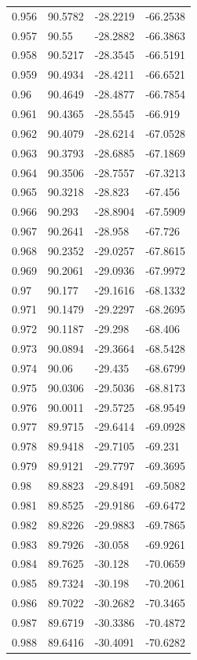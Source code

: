 \begin{tabular}{llll}
0.956 & 90.5782 & -28.2219 & -66.2538 \\
0.957 & 90.55 & -28.2882 & -66.3863 \\
0.958 & 90.5217 & -28.3545 & -66.5191 \\
0.959 & 90.4934 & -28.4211 & -66.6521 \\
0.96 & 90.4649 & -28.4877 & -66.7854 \\
0.961 & 90.4365 & -28.5545 & -66.919 \\
0.962 & 90.4079 & -28.6214 & -67.0528 \\
0.963 & 90.3793 & -28.6885 & -67.1869 \\
0.964 & 90.3506 & -28.7557 & -67.3213 \\
0.965 & 90.3218 & -28.823 & -67.456 \\
0.966 & 90.293 & -28.8904 & -67.5909 \\
0.967 & 90.2641 & -28.958 & -67.726 \\
0.968 & 90.2352 & -29.0257 & -67.8615 \\
0.969 & 90.2061 & -29.0936 & -67.9972 \\
0.97 & 90.177 & -29.1616 & -68.1332 \\
0.971 & 90.1479 & -29.2297 & -68.2695 \\
0.972 & 90.1187 & -29.298 & -68.406 \\
0.973 & 90.0894 & -29.3664 & -68.5428 \\
0.974 & 90.06 & -29.435 & -68.6799 \\
0.975 & 90.0306 & -29.5036 & -68.8173 \\
0.976 & 90.0011 & -29.5725 & -68.9549 \\
0.977 & 89.9715 & -29.6414 & -69.0928 \\
0.978 & 89.9418 & -29.7105 & -69.231 \\
0.979 & 89.9121 & -29.7797 & -69.3695 \\
0.98 & 89.8823 & -29.8491 & -69.5082 \\
0.981 & 89.8525 & -29.9186 & -69.6472 \\
0.982 & 89.8226 & -29.9883 & -69.7865 \\
0.983 & 89.7926 & -30.058 & -69.9261 \\
0.984 & 89.7625 & -30.128 & -70.0659 \\
0.985 & 89.7324 & -30.198 & -70.2061 \\
0.986 & 89.7022 & -30.2682 & -70.3465 \\
0.987 & 89.6719 & -30.3386 & -70.4872 \\
0.988 & 89.6416 & -30.4091 & -70.6282 \\

\end{tabular}
